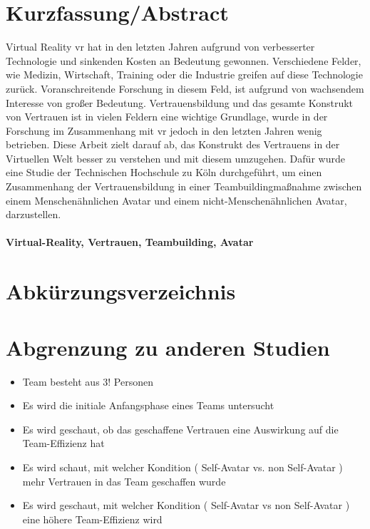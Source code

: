 \documentclass[a4paper,11pt]{article}%
\renewcommand{\\}{\vspace*{0.5\baselineskip} \newline}
\begin{document}
\section*{Kurzfassung/Abstract}
	Virtual Reality \ac{vr} hat in den letzten Jahren aufgrund von verbesserter Technologie und sinkenden Kosten an Bedeutung gewonnen. Verschiedene Felder, wie Medizin, Wirtschaft, Training oder die Industrie greifen auf diese Technologie zurück. Voranschreitende Forschung in diesem Feld, ist aufgrund von wachsendem Interesse von großer Bedeutung. Vertrauensbildung und das gesamte Konstrukt von Vertrauen ist in vielen Feldern eine wichtige Grundlage, wurde in der Forschung im Zusammenhang mit \ac{vr} jedoch in den letzten Jahren wenig betrieben. Diese Arbeit zielt darauf ab, das Konstrukt des Vertrauens in der Virtuellen Welt besser zu verstehen und mit diesem umzugehen. Dafür wurde eine Studie der Technischen Hochschule zu Köln durchgeführt, um einen Zusammenhang der Vertrauensbildung in einer Teambuildingmaßnahme zwischen einem Menschenähnlichen Avatar und einem nicht-Menschenähnlichen Avatar, darzustellen.
	
			\paragraph{Virtual-Reality, Vertrauen, Teambuilding, Avatar}
	\newpage
	\tableofcontents
	\newpage
	
\section*{Abkürzungsverzeichnis}
	
	
	\newpage
	
\section{Abgrenzung zu anderen Studien}
	\begin{itemize}
	\item{Team besteht aus 3! Personen}
	\item{Es wird die initiale Anfangsphase eines Teams untersucht}
	
	\item{Es wird geschaut, ob das geschaffene Vertrauen eine Auswirkung auf die Team-Effizienz hat}
	\item{Es wird schaut, mit welcher Kondition ( Self-Avatar vs. non Self-Avatar ) mehr Vertrauen in das Team geschaffen wurde}
	\item{Es wird geschaut, mit welcher Kondition ( Self-Avatar vs non Self-Avatar ) eine höhere Team-Effizienz wird}
	\end{itemize}		
	
\end{document}
